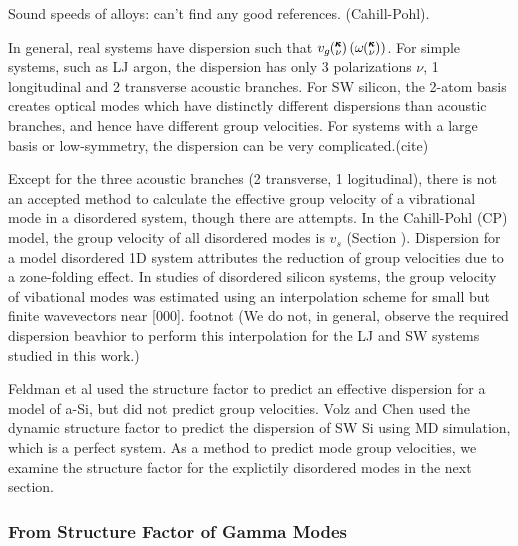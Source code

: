 \documentclass[aps,prb,onecolumn,preprint,superscriptaddress,amsmath,amssymb,floatfix]{revtex4}
\newcommand{\kv}{\mspace{-4.0mu}\left(\mspace{-8.0mu}
\begin{smallmatrix}&\pmb{\kappa} \\&\nu\end{smallmatrix}
\mspace{-3.0mu}\right)}
\begin{document}
Sound speeds of alloys: can't find any good references. (Cahill-Pohl).

In general, real systems have dispersion such that 
$v_g\kv(\omega\kv)$.  For simple systems, such as LJ argon, the 
dispersion has only 3 polarizations $\nu$, 
1 longitudinal and 2 transverse acoustic branches.
\cite{dove_introduction_1993} For SW silicon, the 2-atom basis creates 
optical modes which have distinctly different dispersions than 
acoustic branches, and hence have different group velocities.  For 
systems with a large basis or low-symmetry, 
the dispersion can be very complicated.(cite)

Except for the three 
acoustic branches (2 transverse, 1 logitudinal), there is not an 
accepted method to calculate the effective group velocity of a 
vibrational mode in a disordered system, though there are attempts.
\cite{cahill_lattice_1988,duda_reducing_2011,donadio_atomistic_2009,
he_heat_2011,he_thermal_2011} 
In the Cahill-Pohl (CP) model, the group velocity of all disordered 
modes is $v_s$ (Section ).\cite{cahill_lattice_1988} 
Dispersion for a model disordered 1D system attributes  
the reduction of group 
velocities due to a 
zone-folding effect.\cite{duda_reducing_2011} 
In studies of disordered silicon systems, the group velocity of 
vibational modes was estimated using an interpolation scheme for 
small but finite wavevectors 
near [000]. 
\cite{donadio_atomistic_2009,he_heat_2011,he_thermal_2011} 
footnot
(We do not, in general, observe the required dispersion 
beavhior to perform this interpolation for the LJ and SW systems 
studied in this work.)

Feldman et al used the structure factor to predict an effective dispersion 
for a model of a-Si, but did not predict group velocities.
\cite{feldman_numerical_1999} 
Volz and Chen used the dynamic structure factor to predict the
dispersion of SW Si using MD simulation, which is a perfect system.
\cite{volz_molecular-dynamics_2000} As a method to predict mode group 
velocities, we examine the structure factor 
for the explictily disordered modes in the next section.

\subsubsection{\label{S:From Structure Factor}
From Structure Factor of Gamma Modes}
\end{document}

